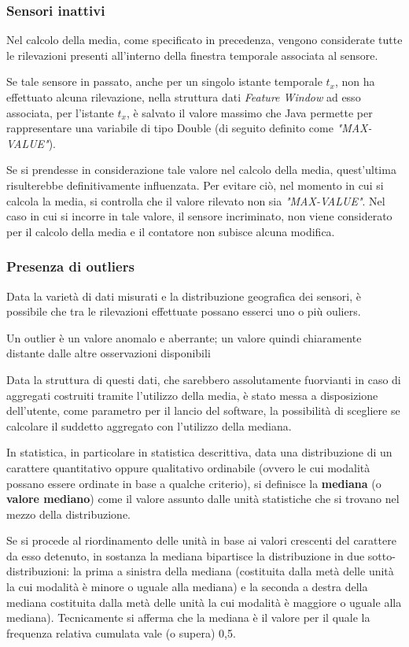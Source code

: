 \documentclass[12pt,a4paper,twoside,openright]{book}
\begin{document}
\subsubsection{Sensori inattivi}
Nel calcolo della media, come specificato in precedenza, vengono considerate tutte le rilevazioni presenti all'interno della finestra temporale associata al sensore. 

Se tale sensore in passato, anche per un singolo istante temporale \textit{$t_{x}$}, non ha effettuato alcuna rilevazione, nella struttura dati \textit{Feature Window} ad esso associata, per l'istante \textit{$t_{x}$}, è salvato il valore massimo che Java permette per rappresentare una variabile di tipo Double (di seguito definito come \textit{"MAX-VALUE"}).


Se si prendesse in considerazione tale valore nel calcolo della media, quest'ultima risulterebbe definitivamente influenzata. Per evitare ciò, nel momento in cui si calcola la media, si controlla che il valore rilevato non sia \textit{"MAX-VALUE"}.
Nel caso in cui si incorre in tale valore, il sensore incriminato, non viene considerato per il calcolo della media e il contatore non subisce alcuna modifica.
 
\subsubsection{Presenza di outliers}
Data la varietà di dati misurati e la distribuzione geografica dei sensori, è possibile che tra le rilevazioni effettuate possano esserci uno o più ouliers. 

Un outlier è un valore anomalo e aberrante; un valore quindi chiaramente distante dalle altre osservazioni disponibili \cite{14a} 

Data la struttura di questi dati, che sarebbero assolutamente fuorvianti in caso di aggregati costruiti tramite l'utilizzo della media, è stato messa a disposizione dell'utente, come parametro per il lancio del software, la possibilità di scegliere se calcolare il suddetto aggregato con l'utilizzo della mediana.

In statistica, in particolare in statistica descrittiva, data una distribuzione di un carattere quantitativo oppure qualitativo ordinabile (ovvero le cui modalità possano essere ordinate in base a qualche criterio), si definisce la \textbf{mediana} (o \textbf{valore mediano}) come il valore assunto dalle unità statistiche che si trovano nel mezzo della distribuzione. 

Se si procede al riordinamento delle unità in base ai valori crescenti del carattere da esso detenuto, in sostanza la mediana bipartisce la distribuzione in due sotto-distribuzioni: la prima a sinistra della mediana (costituita dalla metà delle unità la cui modalità è minore o uguale alla mediana) e la seconda a destra della mediana costituita dalla metà delle unità la cui modalità è maggiore o uguale alla mediana). Tecnicamente si afferma che la mediana è il valore per il quale la frequenza relativa cumulata vale (o supera) 0,5. 
\end{document}

